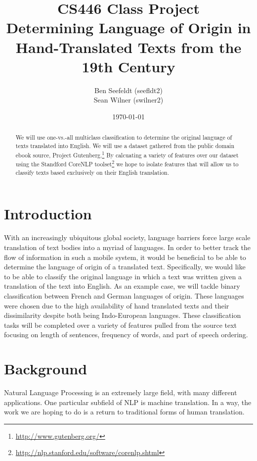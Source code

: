 \documentclass[11pt,letterpaper]{article}
\title { CS446 Class Project\\ \large Determining Language of Origin in
Hand-Translated Texts from the 19th Century }
\author{ Ben Seefeldt (seefldt2)
         \\ Sean Wilner (swilner2) \\ }
\date{\today}
\newcommand{\blue}[1]{\textcolor{RoyalBlue}{#1}}
\newcommand{\instructions}[1]{\blue{\textit{#1}}}
\begin{document}
 \maketitle

\begin{abstract}
We will use one-vs.-all multiclass classification to determine the original
language of texts translated into English. We will use a dataset gathered from
the public domain ebook source, Project
Gutenberg.\footnote{\url{http://www.gutenberg.org/}} By calcuating a variety of
features over our dataset using the Standford CoreNLP
toolset\footnote{\url{http://nlp.stanford.edu/software/corenlp.shtml}} we hope
to isolate features that will allow us to classify texts based exclusively on
their English translation.
\end{abstract}

\section{Introduction} 
\label{sec:introduction}
With an increasingly ubiquitous global society,
language barriers force large scale translation of text bodies into a myriad of
languages.  In order to better track the flow of information in such a mobile
system, it would be beneficial to be able to determine the language of origin
of a translated text.  Specifically, we would like to be able to classify the
original language in which a text was written given a translation of the text
into English.   As an example case, we will tackle binary classification
between French and German languages of origin.  These languages were chosen due
to the high availability of hand translated texts and their dissimilarity
despite both being Indo-European languages.  These classiﬁcation tasks will be
completed over a variety of features pulled from the source text focusing on
length of sentences, frequency of words, and part of speech ordering.\\

\section*{Background}
Natural Language Processing is an extremely large field, with many different
applications. One particular subfield of NLP is machine translation. In a way,
the work we are hoping to do is a return to traditional forms of human
translation.
\end{document}
